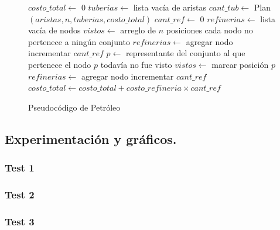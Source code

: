 \begin{figure}[!ht]
\begin{codebox}
\li $costo\_total \leftarrow$ 0
\li $tuberias \leftarrow$ lista vacía de aristas
\li $cant\_tub \leftarrow$ {\sc Plan}$(aristas,n,tuberias,costo\_total)$
\li $cant\_ref \leftarrow$ 0
\li $refinerias \leftarrow$ lista vacía de nodos
\li $vistos \leftarrow$ arreglo de $n$ posiciones
\li \For cada nodo
\li 	\Do
		\If no pertenece a ningún conjunto
\li		\Then
			$refinerias \leftarrow$ agregar nodo
\li			incrementar $cant\_ref$
\li		\Else 
\li 			$p \leftarrow$ representante del conjunto al que pertenece el nodo
\li			\If $p$ todavía no fue visto
\li			\Then
				$vistos \leftarrow$ marcar posición $p$
\li				$refinerias \leftarrow$ agregar nodo
\li				incrementar $cant\_ref$
			\End
		\End
	\End
\li	$costo\_total \leftarrow costo\_total + costo\_refineria \times cant\_ref$
\end{codebox} 
\caption{Pseudocódigo de Petróleo}\label{code:petroleo}
\end{figure}

\vspace*{0.6cm}

\subsection{Experimentación y gráficos.}

\vspace*{0.3cm}


\subsubsection{Test 1}

\vspace*{0.3cm}


\vspace*{0.6cm}

\subsubsection{Test 2}

\vspace*{0.3cm}


\vspace*{0.6cm}

\subsubsection{Test 3}

\vspace*{0.3cm}

